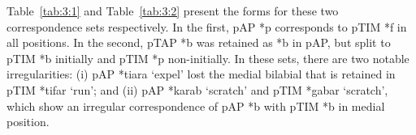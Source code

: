 \newpage 
Table~\ref{tab:3:1} and Table~\ref{tab:3:2} present the forms for these two correspondence sets respectively. In the first, pAP *p corresponds to pTIM *f in all positions. In the second, pTAP *b was retained as *b in pAP, but split to pTIM *b initially and pTIM *p non-initially. In these sets, there are two notable irregularities: 
(i) pAP *tiara `expel' lost the medial bilabial that is retained in pTIM *tifar `run'; and 
(ii) pAP *karab `scratch' and pTIM *gabar `scratch', which show an irregular correspondence of pAP *b with pTIM *b in medial position. 
 


